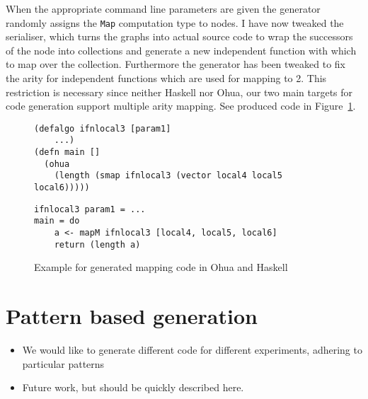 When the appropriate command line parameters are given the generator randomly assigns the \texttt{Map} computation type to nodes.
I have now tweaked the serialiser, which turns the graphs into actual source code to wrap the successors of the node into collections and generate a new independent function with which to map over the collection.
Furthermore the generator has been tweaked to fix the arity for independent functions which are used for mapping to 2.
This restriction is necessary since neither Haskell nor Ohua, our two main targets for code generation support multiple arity mapping.
See produced code in Figure~\ref{fig:generated-map-code}.

\begin{figure}
\begin{verbatim}
(defalgo ifnlocal3 [param1]
    ...)
(defn main []
  (ohua
    (length (smap ifnlocal3 (vector local4 local5 local6)))))
\end{verbatim}
\begin{verbatim}
ifnlocal3 param1 = ...
main = do
    a <- mapM ifnlocal3 [local4, local5, local6]
    return (length a)
\end{verbatim}
\caption{Example for generated mapping code in Ohua and Haskell}
\label{fig:generated-map-code}
\end{figure}

\section{Pattern based generation}

\begin{itemize}
  \item We would like to generate different code for different experiments, adhering to particular patterns
  \item Future work, but should be quickly described here.
\end{itemize}
